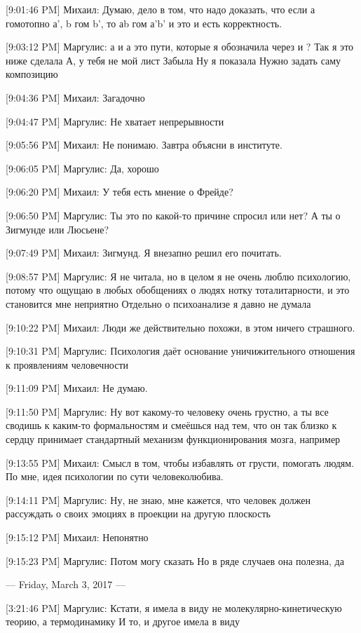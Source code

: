 \documentclass{article}
\begin{document}
[9:01:46 PM] Михаил:
Думаю, дело в том, что надо доказать, что если а гомотопно а', b гом b', то  аb гом а'b' и это и есть корректность.

[9:03:12 PM] Маргулис:
а и а это пути, которые я обозначила через  и ?
 Так я это ниже сделала
 А, у тебя не мой лист
 Забыла
 Ну я показала
 Нужно задать саму композицию

[9:04:36 PM] Михаил:
Загадочно

[9:04:47 PM] Маргулис:
Не хватает непрерывности

[9:05:56 PM] Михаил:
Не понимаю. Завтра объясни в институте.

[9:06:05 PM] Маргулис:
Да, хорошо

[9:06:20 PM] Михаил:
У тебя есть мнение о Фрейде?

[9:06:50 PM] Маргулис:
Ты это по какой-то причине спросил или нет?
 А ты о Зигмунде или Люсьене?

[9:07:49 PM] Михаил:
Зигмунд. Я внезапно решил его почитать.

[9:08:57 PM] Маргулис:
Я не читала, но в целом я не очень люблю психологию, потому что ощущаю в любых обобщениях о людях нотку тоталитарности, и это становится мне неприятно
 Отдельно о психоанализе я давно не думала

[9:10:22 PM] Михаил:
Люди же действительно похожи, в этом ничего страшного.

[9:10:31 PM] Маргулис:
Психология даёт основание уничижительного отношения к проявлениям человечности

[9:11:09 PM] Михаил:
Не думаю.

[9:11:50 PM] Маргулис:
Ну вот какому-то человеку очень грустно, а ты все сводишь к каким-то формальностям и смеёшься над тем, что он так близко к сердцу принимает стандартный механизм функционирования мозга, например

[9:13:55 PM] Михаил:
Смысл в том, чтобы избавлять от грусти, помогать людям. По мне, идея психологии по сути человеколюбива.

[9:14:11 PM] Маргулис:
Ну, не знаю, мне кажется, что человек должен рассуждать о своих эмоциях в проекции на другую плоскость

[9:15:12 PM] Михаил:
Непонятно

[9:15:23 PM] Маргулис:
Потом могу сказать
 Но в ряде случаев она полезна, да

--- Friday, March 3, 2017 ---

[3:21:46 PM] Маргулис:
Кстати, я имела в виду не молекулярно-кинетическую теорию, а термодинамику
 И то, и другое имела в виду
\end{document}

